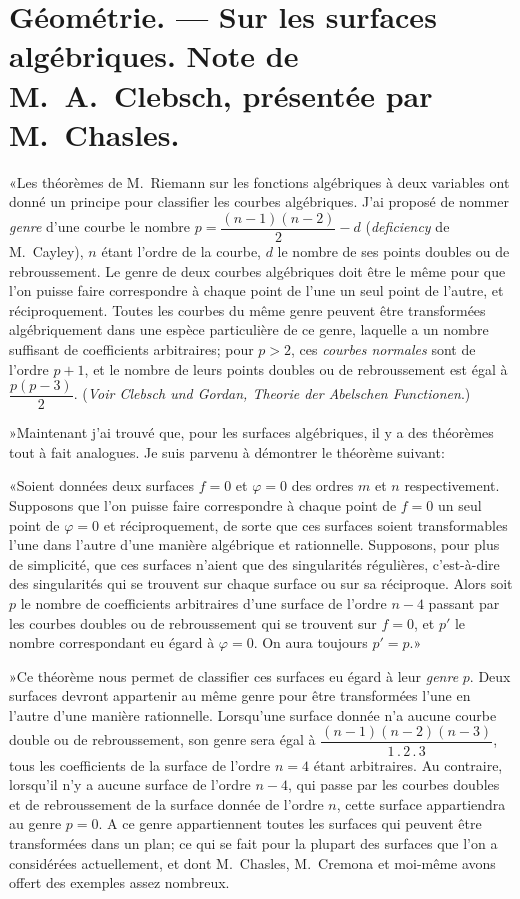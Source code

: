 \documentclass{article}
\begin{document}
\section*{Géométrie. --- Sur les surfaces algébriques. Note de M.\ A.\ Clebsch, présentée par M.\ Chasles.}

«Les théorèmes de M.\ Riemann sur les fonctions algébriques à deux variables ont donné un principe pour classifier les courbes algébriques. J'ai proposé de nommer \emph{genre} d'une courbe le nombre $p = \dfrac{(n-1)(n-2)}{2} - d$ (\emph{deficiency} de M.\ Cayley), $n$ étant l'ordre de la courbe, $d$ le nombre de ses points doubles ou de rebroussement. Le genre de deux courbes algébriques doit être le même pour que l'on puisse faire correspondre à chaque point de l'une un seul point de l'autre, et réciproquement. Toutes les courbes du même genre peuvent être transformées algébriquement dans une espèce particulière de ce genre, laquelle a un nombre suffisant de coefficients arbitraires; pour $p > 2$, ces \emph{courbes normales} sont de l'ordre $p + 1$, et le nombre de leurs points doubles ou de rebroussement est égal à $\dfrac{p(p-3)}{2}$. (\emph{Voir Clebsch und Gordan, Theorie der Abelschen Functionen}.)

»Maintenant j'ai trouvé que, pour les surfaces algébriques, il y a des
théorèmes tout à fait analogues. Je suis parvenu à démontrer le théorème suivant:

«Soient données deux surfaces $f = 0$ et $\varphi = 0$ des ordres $m$ et $n$ respectivement. Supposons que l'on puisse faire correspondre à chaque point de $f = 0$ un seul point de $\varphi = 0$ et réciproquement, de sorte que ces surfaces soient transformables l'une dans l'autre d'une manière algébrique et rationnelle. Supposons, pour plus de simplicité, que ces surfaces n'aient que des singularités régulières, c'est-à-dire des singularités qui se trouvent sur chaque surface ou sur sa réciproque. Alors soit $p$ le nombre de coefficients arbitraires d'une surface de l'ordre $n - 4$ passant par les courbes doubles ou de rebroussement qui se trouvent sur $f = 0$, et $p'$ le nombre correspondant eu égard à $\varphi = 0$. On aura toujours $p' = p$.»

»Ce théorème nous permet de classifier ces surfaces eu égard à leur \emph{genre} $p$. Deux surfaces devront appartenir au même genre pour être transformées l'une en l'autre d'une manière rationnelle. Lorsqu'une surface donnée n'a aucune courbe double ou de rebroussement, son genre sera égal à $\dfrac{(n-1)(n-2)(n-3)}{1 \,.\, 2 \,.\, 3}$, tous les coefficients de la surface de l'ordre $n = 4$ étant arbitraires. Au contraire, lorsqu'il n'y a aucune surface de l'ordre $n - 4$, qui passe par les courbes doubles et de rebroussement de la surface donnée de l'ordre $n$, cette surface appartiendra au genre $p = 0$. A ce genre appartiennent toutes les surfaces qui peuvent être transformées dans un plan; ce qui se fait pour la plupart des surfaces que l'on a considérées actuellement, et dont M.\ Chasles, M.\ Cremona et moi-même avons offert des exemples assez nombreux.
\end{document}
